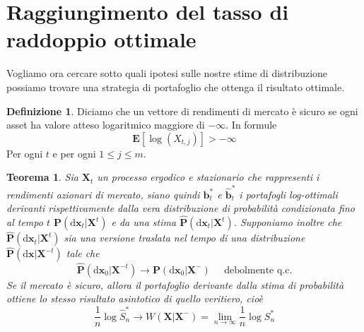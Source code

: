 \documentclass[a4paper,11pt]{book}
\theoremstyle{plain}
\newtheorem{teo}{Teorema}[chapter]
\theoremstyle{definition}
\newtheorem{defn}{Definizione}[chapter]
\theoremstyle{remark}
\newcommand{\dX}{\text{d}\bm{x}}
\newcommand{\X}{\bm{X}}
\newcommand{\B}{\bm{b}}
\newcommand{\Pro}{\mathbf{P}}
\newcommand{\E}{\mathbf{E}}
\newcommand{\bh}{\hat{\bm{b}}}
\newcommand{\Sh}{\hat{S}}
\newcommand{\Ph}{\hat{\mathbf{P}}}
\begin{document}
\section{Raggiungimento del tasso di raddoppio ottimale}
Vogliamo ora cercare sotto quali ipotesi sulle nostre stime di distribuzione possiamo trovare una strategia di portafoglio che ottenga il risultato ottimale.
\begin{defn}
	Diciamo che un vettore di rendimenti di mercato è sicuro se
	ogni asset ha valore atteso logaritmico maggiore di $-\infty$. In formule
\begin{equation*}
		\E[\log(X_{t,j})]>-\infty
	\end{equation*}
	Per ogni $t$ e per ogni $1\leq j\leq m$.
\end{defn}
\begin{teo}
	Sia $\X_t$ un processo ergodico e stazionario che rappresenti i rendimenti azionari di mercato, siano quindi $\B^*_t$ e $\bh_t^*$ i portafogli log-ottimali derivanti rispettivamente dalla vera distribuzione di probabilità condizionata fino al tempo $t$ $\Pro(\dX_t|\X^t)$ e da una stima $\Ph(\dX_t|\X^t)$. Supponiamo inoltre che $\Ph(\dX_t|\X^t)$ sia una versione traslata nel tempo di una distribuzione $\Ph(\dX|\X^{-t})$ tale che
	\begin{equation*}
		\Ph(\dX_0|\X^{-t})\rightarrow \Pro(\dX_0|\X^{-}) \;\;\;\;\; \text{debolmente q.c.}
	\end{equation*}
	Se il mercato è sicuro, allora il portafoglio derivante dalla stima di probabilità ottiene lo stesso risultato asintotico di quello veritiero, cioè
	\begin{equation*}
		\frac{1}{n}\log\Sh^*_n\rightarrow W(\X|\X^{-})=\lim\limits_{n\to\infty}\frac{1}{n}\log S^*_n
	\end{equation*}
\end{teo}
\end{document}
